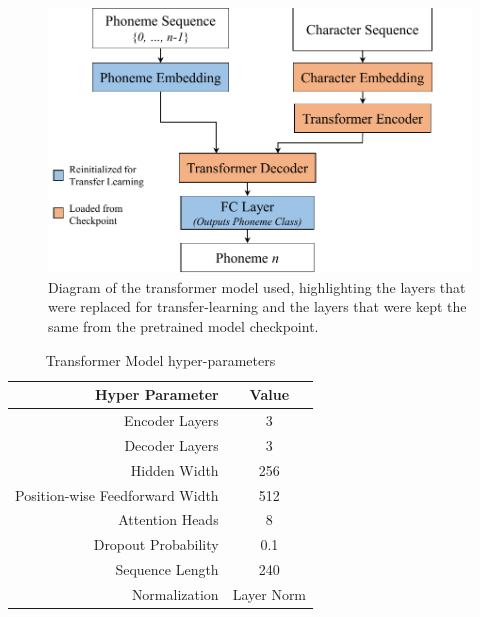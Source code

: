 \begin{figure}[hbt!]
  \includegraphics[width=\linewidth]{figures/g2p_model_2.pdf}
   \caption{Diagram of the transformer model used, highlighting the layers that were replaced for transfer-learning and the layers that were kept the same from the pretrained model checkpoint.}
   \label{fig:g2pmodel}
\end{figure}
\begin{table}[h!]
\caption{Transformer Model hyper-parameters}
 \label{tab:table1}
  \begin{center}
\begin{tabular}{rc} 
\toprule
\textbf{Hyper Parameter} & \textbf{Value}  \\ 
\toprule
Encoder Layers                               & 3               \\
Decoder Layers                               & 3               \\
Hidden Width                                 & 256             \\
Position-wise Feedforward Width              & 512             \\
Attention Heads                              & 8               \\
Dropout Probability                          & 0.1             \\
Sequence Length                              & 240             \\
Normalization                                & Layer Norm      \\
\toprule
\end{tabular}
  \end{center}
\end{table}
